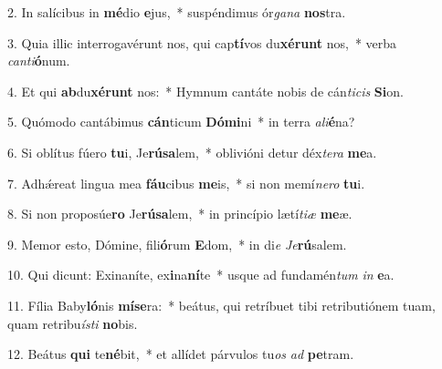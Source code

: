 2. In salícibus in \textbf{mé}dio \textbf{e}jus,~*  suspéndimus ór\textit{ga}\textit{na} \textbf{nos}tra.\

3. Quia illic interrogavérunt nos, qui cap\textbf{tí}vos du\textbf{xé}\textbf{runt} nos,~*  verba \textit{can}\textit{ti}\textbf{ó}num.\

4. Et qui \textbf{ab}du\textbf{xé}\textbf{runt} nos:~*  Hymnum cantáte nobis de cán\textit{ti}\textit{cis} \textbf{Si}on.\

5. Quómodo cantábimus \textbf{cán}ticum \textbf{Dó}\textbf{mi}ni~*  in terra \textit{a}\textit{li}\textbf{é}na?\

6. Si oblítus fúero \textbf{tu}i, Je\textbf{rú}\textbf{sa}lem,~*  oblivióni detur déx\textit{te}\textit{ra} \textbf{me}a.\

7. Adhǽreat lingua mea \textbf{fáu}cibus \textbf{me}is,~*  si non memí\textit{ne}\textit{ro} \textbf{tu}i.\

8. Si non proposúe\textbf{ro} Je\textbf{rú}\textbf{sa}lem,~*  in princípio lætí\textit{ti}\textit{æ} \textbf{me}æ.\

9. Memor esto, Dómine, fili\textbf{ó}rum \textbf{E}dom,~*  in di\textit{e} \textit{Je}\textbf{rú}salem.\

10. Qui dicunt: Exinaníte, ex\textbf{i}na\textbf{ní}te~*  usque ad fundamén\textit{tum} \textit{in} \textbf{e}a.\

11. Fília Baby\textbf{ló}nis \textbf{mí}\textbf{se}ra:~*  beátus, qui retríbuet tibi retributiónem tuam, quam retribu\textit{ís}\textit{ti} \textbf{no}bis.\

12. Beátus \textbf{qui} te\textbf{né}bit,~*  et allídet párvulos tu\textit{os} \textit{ad} \textbf{pe}tram.\

